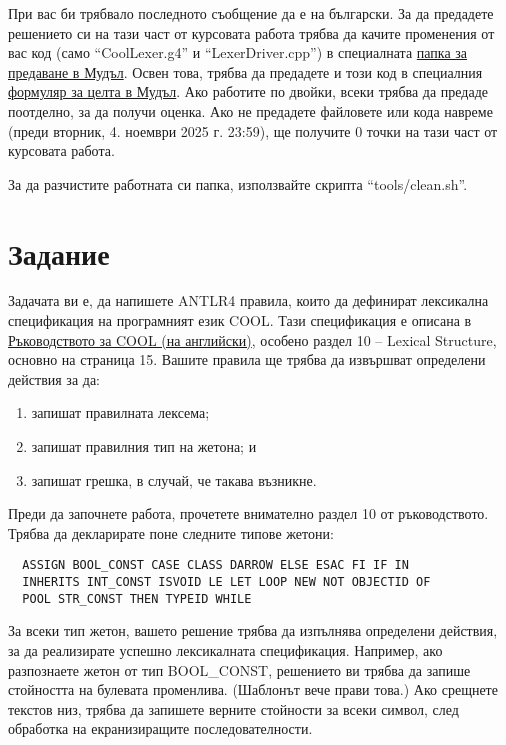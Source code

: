 \documentclass[11pt]{article}
\makeatletter
\newcommand{\verbatimfont}[1]{\def\verbatim@font{#1}}%
\makeatother
\begin{document}
При вас би трябвало последното съобщение да е на български.
За да предадете решението си на тази част от курсовата работа трябва да качите променения от вас код (само ``CoolLexer.g4'' и ``LexerDriver.cpp'') в специалната \href{https://learn.fmi.uni-sofia.bg/mod/publication/view.php?id=359465}{папка за предаване в Мудъл}.
Освен това, трябва да предадете и този код в специалния \href{https://learn.fmi.uni-sofia.bg/mod/quiz/view.php?id=358624}{формуляр за целта в Мудъл}.
Ако работите по двойки, всеки трябва да предаде поотделно, за да получи оценка.
Ако не предадете файловете или кода навреме (преди вторник, 4. ноември 2025 г. 23:59), ще получите 0 точки на тази част от курсовата работа.

За да разчистите работната си папка, използвайте скрипта ``tools/clean.sh''.

\section{Задание}

Задачата ви е, да напишете ANTLR4 правила, които да дефинират лексикална спецификация на програмният език COOL.
Тази спецификация е описана в \href{https://web.stanford.edu/class/cs143/materials/cool-manual.pdf}{Ръководството за COOL (на английски)}, особено раздел 10 -- Lexical Structure, основно на страница 15.
Вашите правила ще трябва да извършват определени действия за да:

\begin{enumerate}
    \item запишат правилната лексема;
    \item запишат правилния тип на жетона; и
    \item запишат грешка, в случай, че такава възникне.
\end{enumerate}

Преди да започнете работа, прочетете внимателно раздел 10 от ръководството.
Трябва да декларирате поне следните типове жетони:

\verbatimfont{\CyrMono}
\begin{verbatim}
  ASSIGN BOOL_CONST CASE CLASS DARROW ELSE ESAC FI IF IN
  INHERITS INT_CONST ISVOID LE LET LOOP NEW NOT OBJECTID OF
  POOL STR_CONST THEN TYPEID WHILE
\end{verbatim}

За всеки тип жетон, вашето решение трябва да изпълнява определени действия, за да реализирате успешно лексикалната спецификация.
Например, ако разпознаете жетон от тип BOOL\_CONST, решението ви трябва да запише стойността на булевата променлива.
(Шаблонът вече прави това.)
Ако срещнете текстов низ, трябва да запишете верните стойности за всеки символ, след обработка на екранизиращите последователности.
\end{document}
